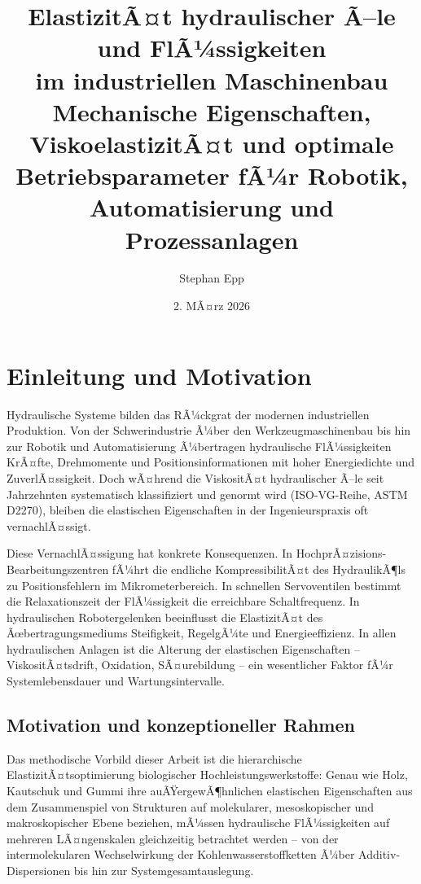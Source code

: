 ﻿\documentclass[a4paper,12pt]{scrreprt}
\title{%
  \textbf{ElastizitÃ¤t hydraulischer Ã–le und FlÃ¼ssigkeiten\\
  im industriellen Maschinenbau}\\[0.5em]
  \large Mechanische Eigenschaften, ViskoelastizitÃ¤t und optimale\\
  Betriebsparameter fÃ¼r Robotik, Automatisierung und Prozessanlagen
}
\author{Stephan Epp}
\date{2. MÃ¤rz 2026}
\theoremstyle{definition}
\begin{document}
\maketitle
\tableofcontents
\newpage

\section{Einleitung und Motivation}

Hydraulische Systeme bilden das RÃ¼ckgrat der modernen industriellen Produktion.
Von der Schwerindustrie Ã¼ber den Werkzeugmaschinenbau bis hin zur Robotik und
Automatisierung Ã¼bertragen hydraulische FlÃ¼ssigkeiten KrÃ¤fte, Drehmomente und
Positionsinformationen mit hoher Energiedichte und ZuverlÃ¤ssigkeit. Doch
wÃ¤hrend die ViskositÃ¤t hydraulischer Ã–le seit Jahrzehnten systematisch
klassifiziert und genormt wird (ISO-VG-Reihe, ASTM D2270), bleiben die
elastischen Eigenschaften in der Ingenieurspraxis oft vernachlÃ¤ssigt.

Diese VernachlÃ¤ssigung hat konkrete Konsequenzen. In HochprÃ¤zisions-Bearbeitungs\-zentren
fÃ¼hrt die endliche KompressibilitÃ¤t des HydraulikÃ¶ls zu Positionsfehlern im
Mikrometerbereich. In schnellen Servoventilen bestimmt die Relaxationszeit der
FlÃ¼ssigkeit die erreichbare Schaltfrequenz. In hydraulischen Robotergelenken
beeinflusst die ElastizitÃ¤t des Ãœbertragungsmediums Steifigkeit, RegelgÃ¼te und
Energieeffizienz. In allen hydraulischen Anlagen ist die Alterung der
elastischen Eigenschaften -- ViskositÃ¤tsdrift, Oxidation, SÃ¤urebildung -- ein
wesentlicher Faktor fÃ¼r Systemlebensdauer und Wartungsintervalle.

\subsection{Motivation und konzeptioneller Rahmen}

Das methodische Vorbild dieser Arbeit ist die hierarchische ElastizitÃ¤tsoptimierung
biologischer Hochleistungswerkstoffe: Genau wie Holz, Kautschuk und Gummi
ihre auÃŸergewÃ¶hnlichen elastischen Eigenschaften aus dem Zusammenspiel von
Strukturen auf molekularer, mesoskopischer und makroskopischer Ebene beziehen,
mÃ¼ssen hydraulische FlÃ¼ssigkeiten auf mehreren LÃ¤ngenskalen gleichzeitig
betrachtet werden -- von der intermolekularen Wechselwirkung der
Kohlenwasserstoffketten Ã¼ber Additiv-Dispersionen bis hin zur
System\-gesamtauslegung.
\end{document}
